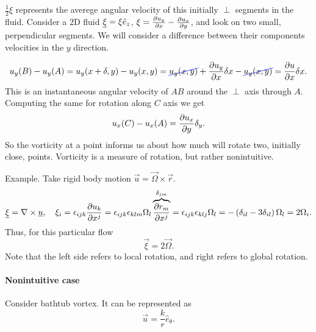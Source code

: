 \documentclass[../main.tex]{subfiles}
\begin{document}
  
  $\frac{1}{2}\xi$ represents the averege angular velocity of this initially $\perp$ segments in the fluid.
  Consider a $2$D fluid $\underline{\xi} = \xi \hat{e}_z$, $\xi = \frac{\partial u_y}{\partial x} - \frac{\partial u_x}{\partial y}$, and look on two
  small, perpendicular segments. We will consider a difference between their components velocities in the $y$ direction.
  \begin{figure}[h]
    \centering
    \label{fig:}
  \end{figure}
  \begin{displaymath}
    u_y(B) - u_y(A) = u_y(x + \delta, y)- u_y(x, y) 
    = \Ccancel[blue]{u_y(x, y)} + \ptf{u_y}{x} \delta x - \Ccancel[blue]{u_y(x, y)}
    = \ptf{u}{x} \delta x.
  \end{displaymath}
  This is an instantaneous  angular velocity of $AB$ around the $\perp$ axis through $A$.
  Computing the same for rotation along $C$ axis we get
  \begin{displaymath}
    u_x(C) - u_x(A) = \frac{\partial u_x}{\partial y} \delta_y.
  \end{displaymath}
  So the vorticity at a point informs us about how much will rotate two, initially close, points. %
  Vorticity is a measure of rotation, but rather nonintuitive.
  
  Example. Take rigid body motion $\vec u = \vec \Omega \times \vec r$.
  \begin{displaymath}
    \underline{\xi} = \nabla \times \underline{u} , \quad \xi_i 
    = \epsilon_{ijk} \frac{\partial u_k}{\partial x^j}
    = \epsilon_{ijk} \epsilon_{klm} \Omega_l \overbrace{\frac{\partial r_m}{\partial x^j}}^{\delta_{jm}}
    = \epsilon_{ijk} \epsilon_{klj} \Omega_l 
    = - \left( \delta_{il} - 3 \delta_{il} \right) \Omega_l = 2 \Omega_i.
  \end{displaymath}
  Thus, for this particular flow
  \begin{displaymath}
    \vec \xi = 2 \vec \Omega.
  \end{displaymath}
  Note that the left side refers to local rotation, and right refers to global rotation.

  \paragraph{Nonintuitive case}
  Consider bathtub vortex.
  It can be represented as
  \begin{displaymath}
    \vec u = \frac{k}{r} \hat{e}_\theta.
  \end{displaymath}
  
\end{document}
